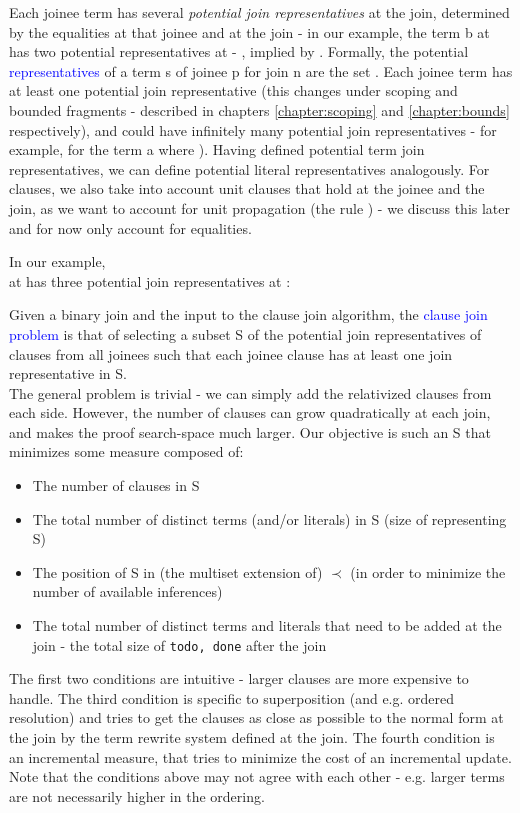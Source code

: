 Each joinee term has several \emph{potential join representatives} at the join, determined by the equalities at that joinee and at the join - in our example, the term b at  has two potential representatives at  - , implied by .
Formally, the potential \textcolor{blue}{representatives} of a term s of joinee p for join n are the set .
Each joinee term has at least one potential join representative (this changes under scoping and bounded fragments - described in chapters \ref{chapter:scoping} and \ref{chapter:bounds} respectively), and could have infinitely many potential join representatives - for example, for the term a where ).
Having defined potential term join representatives, we can define potential literal representatives analogously.
For clauses, we also take into account unit clauses that hold at the joinee and the join, as we want to account for unit propagation (the rule ) - we discuss this later and for now only account for equalities.

In our example,\\
 at  has three potential join representatives at :\\

\bigskip

Given a binary join and the input to the clause join algorithm, 
the \textcolor{blue}{clause join problem} is that of selecting a subset S of the potential join representatives of clauses from all joinees such that each joinee clause has at least one join representative in S.\\
The general problem is trivial - we can simply add the relativized clauses from each side.
However, the number of clauses can grow quadratically at each join, and makes the proof search-space much larger.
Our objective is such an S that minimizes some measure composed of:
\begin{itemize}
	\item The number of clauses in S
	\item The total number of distinct terms (and/or literals) in S (size of representing S)
	\item The position of S in (the multiset extension of) $\prec$ (in order to minimize the number of available inferences)
	\item The total number of distinct terms and literals that need to be added at the join - the total size of \lstinline|todo, done| after the join
\end{itemize}
The first two conditions are intuitive - larger clauses are more expensive to handle.
The third condition is specific to superposition (and e.g. ordered resolution) and tries to get the clauses as close as possible to the normal form at the join by the term rewrite system defined at the join. The fourth condition is an incremental measure, that tries to minimize the cost of an incremental update. Note that the conditions above may not agree with each other - e.g. larger terms are not necessarily higher in the ordering.




